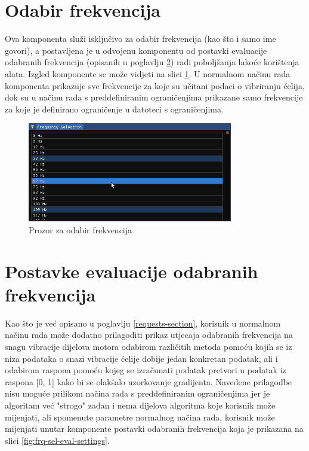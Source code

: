 \documentclass[times, utf8, diplomski]{fer}
\begin{document}
\section{Odabir frekvencija} \label{frequency-selection-section}

Ova komponenta služi isključivo za odabir frekvencija (kao što i samo ime govori), a postavljena je u odvojenu komponentu od postavki evaluacije odabranih frekvencija (opisanih u poglavlju \ref{frequency-settings-section}) radi poboljšanja lakoće korištenja alata. Izgled komponente se može vidjeti na slici \ref{fig:frequency-selection-view}. U normalnom načinu rada komponenta prikazuje sve frekvencije za koje su učitani podaci o vibriranju ćelija, dok su u načinu rada s preddefiniranim ograničenjima prikazane samo frekvencije za koje je definirano ograničenje u datoteci s ograničenjima.

\begin{figure} [H]
	\centering
    \includegraphics[width=0.8\textwidth]{frequency_selection_view.png}
    \caption{Prozor za odabir frekvencija}
    \label{fig:frequency-selection-view}
\end{figure}

\section{Postavke evaluacije odabranih frekvencija} \label{frequency-settings-section}

Kao što je već opisano u poglavlju \ref{requests-section}, korisnik u normalnom načinu rada može dodatno prilagoditi prikaz utjecaja odabranih frekvencija na snagu vibracije dijelova motora odabirom različitih metoda pomoću kojih se iz niza podataka o snazi vibracije ćelije dobije jedan konkretan podatak, ali i odabirom raspona pomoću kojeg se izračunati podatak pretvori u podatak iz raspona [0, 1] kako bi se olakšalo uzorkovanje gradijenta. Navedene prilagodbe nisu moguće prilikom načina rada s preddefiniranim ograničenjima jer je algoritam već "strogo" zadan i nema dijelova algoritma koje korisnik može mijenjati, ali spomenute parametre normalnog načina rada, korisnik može mijenjati unutar komponente postavki odabranih frekvencija koja je prikazana na slici \ref{fig:frq-sel-eval-settings}.
\end{document}
